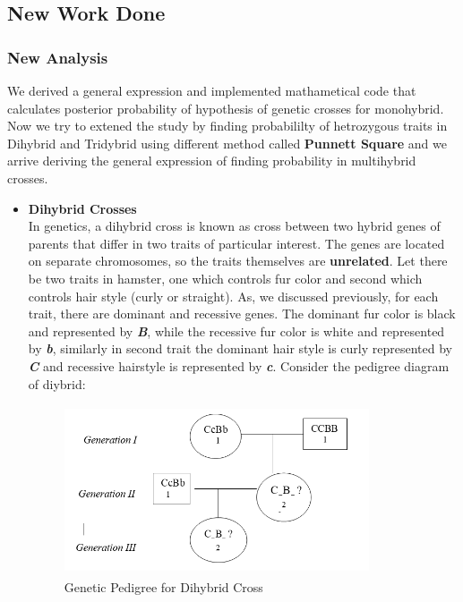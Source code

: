 \documentclass{article}
\begin{document}
\subsection{New Work Done}

\subsubsection{New Analysis}

	We derived a general expression and implemented mathametical code that calculates posterior probability of hypothesis of genetic crosses for monohybrid. Now we try to extened the study by finding probabililty of hetrozygous traits in Dihybrid and Tridybrid using different method called \textbf{Punnett Square} and we arrive deriving the general expression of finding probability in multihybrid crosses.
	\begin{itemize}
     \item   \textbf{Dihybrid Crosses}\\
     In genetics, a dihybrid cross is known as cross between two hybrid genes of parents that differ in two traits of particular interest. The genes are located on separate chromosomes, so the traits themselves are \textbf{unrelated}. Let there be two traits in hamster, one which controls fur color and second which controls hair style (curly or straight). As, we discussed previously, for each trait, there are dominant and recessive genes. The dominant fur color is black and represented by \textbf{\textit{B}}, while the recessive fur color is white and represented by \textbf{\textit{b}}, similarly in second trait the dominant hair style is curly represented by \textbf{\textit{C}} and recessive hairstyle is represented by \textbf{\textit{c}}. Consider the pedigree diagram of diybrid:\\
     \begin{figure}[h]
     	\centering
     	\includegraphics[height=5cm,width=9cm]{dihybrid_pedigree}
     	\caption{Genetic Pedigree for Dihybrid Cross}
     \end{figure}

\end{itemize}
\end{document}

